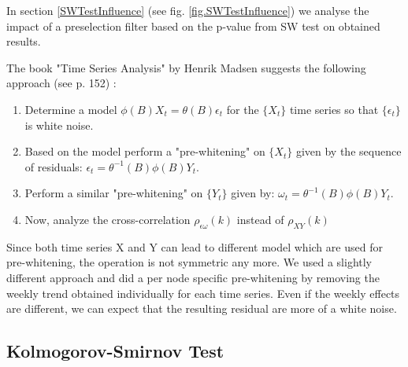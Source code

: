 \documentclass[a4paper,10pt]{scrbook}
\begin{document}
\label{ext.fig.ShapiroWilkResults} 


\label{ext.fig.ShapiroWilkResults} 


In section \ref{SWTestInfluence} (see fig. \ref{fig.SWTestInfluence}) we analyse the impact of a preselection filter based on the p-value from SW test on obtained results.

The book "Time Series Analysis" by Henrik Madsen \cite{bookMadsen} suggests the following approach (see p. 152) :
\begin{enumerate}
\item Determine a model $\phi( B )X_t=\theta( B )\epsilon_t$ for the $\lbrace X_t \rbrace$ time series so that $\lbrace \epsilon_t \rbrace$ is white noise.
\item Based on the model perform a "pre-whitening" on $\lbrace X_t \rbrace$ given by the sequence of residuals: $\epsilon_t = \theta^{-1}(B)\phi(B)Y_t$.
\item Perform a similar "pre-whitening" on $\lbrace Y_t \rbrace$ given by: $\omega_t = \theta^{-1}(B)\phi(B)Y_t$.
\item Now, analyze the cross-correlation $\rho_{\epsilon \omega}(k)$ instead of $\rho_{XY}(k)$
\end{enumerate}
Since both time series X and Y can lead to different model which are used for pre-whitening, the operation is not symmetric any more. We used a slightly different approach and did a per node specific pre-whitening by removing the weekly trend obtained individually for each time series. Even if the weekly effects are different, we can expect that the resulting residual are more of a white noise. 

 
%
%
%



%

%


 



\subsection{Kolmogorov-Smirnov Test}
\label{KSTEST}
\end{document}
